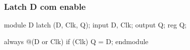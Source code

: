 
\begin{frame}[fragile]
	\frametitle{Latch D com enable}
	\begin{verilogcode}
module D latch (D, Clk, Q); 
  input D, Clk;
  output Q;
  reg Q;

  always @(D or Clk) 
    if (Clk)
      Q = D;
endmodule
    \end{verilogcode}
\end{frame}

